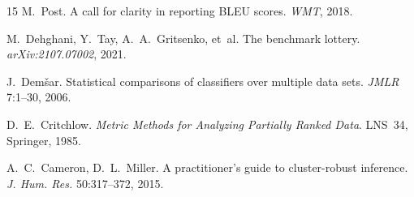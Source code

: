 \documentclass[sigconf,anonymous]{acmart}
\begin{document}
\begin{thebibliography}{15}
 M.~Post.
A call for clarity in reporting {BLEU} scores.
\emph{WMT}, 2018.

 M.~Dehghani, Y.~Tay, A.~A.~Gritsenko, et~al.
The benchmark lottery.
\emph{arXiv:2107.07002}, 2021.

 J.~Dem\v{s}ar.
Statistical comparisons of classifiers over multiple data sets.
\emph{JMLR} 7:1--30, 2006.

 D.~E.~Critchlow.
\emph{Metric Methods for Analyzing Partially Ranked Data}. LNS~34, Springer, 1985.

 A.~C.~Cameron, D.~L.~Miller.
A practitioner's guide to cluster-robust inference. \emph{J. Hum. Res.} 50:317--372, 2015.

\end{thebibliography}
\endgroup
\end{document}
